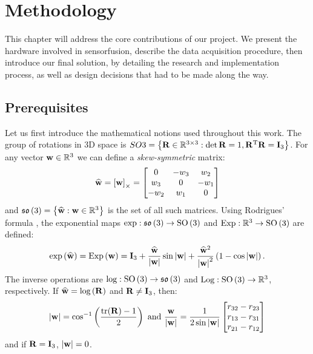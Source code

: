 \chapter{Methodology}
\label{ch:methodology}

This chapter will address the core contributions of our project.
We present the hardware involved in \gls{sensorfusion}, describe the data acquisition procedure, then introduce our final solution, by detailing the research and implementation process, as well as design decisions that had to be made along the way.

\section{Prerequisites}

\newcommand{\wvec}{\vecx{w}}
\newcommand{\what}{\widehat{\vecx{w}}}
\newcommand{\wmod}{\left|\vecx{w}\right|}
\newcommand{\xihat}{\widehat{\xi}}

Let us first introduce the mathematical notions used throughout this work. The group of rotations in 3D space is $SO{3} = \left\{\mathbf{R} \in {\mathbb{R}}^{3\times3} : \det{\mathbf{R}} = 1, {\mathbf{R}}^\text{T}\mathbf{R} = \mathbf{I}_3 \right\}$. For any vector $\wvec \in \RR^3$ we can define a \emph{skew-symmetric} matrix:
\begin{equation}
	\what  = \skewsym{\wvec} =
	\begin{bmatrix}
		0    & -w_3 & w_2  \\
		w_3  & 0    & -w_1 \\
		-w_2 & w_1  & 0
	\end{bmatrix}
\end{equation}
and $\so{3} = \left\{\what : \vecx{w} \in \RR^3 \right\}$ is the set of all such matrices. Using Rodrigues' formula \cite{murray2017mathematical}, the exponential maps $\text{exp}: \mathfrak{so}\left(3\right) \rightarrow \operatorname{SO}\left(3\right)$ and $\text{Exp} :{\mathbb{R}}^3 \rightarrow \operatorname{SO}\left(3\right)$ are defined:
\begin{equation}
	\expmap{\what} =\Expmap{\wvec}= \matx{I}_3 + \frac{\what}{\wmod} \sin{\wmod} + \frac{\what^2}{\wmod^2}\left(1 - \cos{\wmod}\right)\text{.}
\end{equation}
The inverse operations are $\text{log}:  \operatorname{SO}\left(3\right) \rightarrow \mathfrak{so}\left(3\right)$ and $\text{Log} :\operatorname{SO}\left(3\right) \rightarrow {\mathbb{R}}^3$, respectively. If $\what = \logmap{\matx{R}}$ and $\mathbf{R} \neq \mathbf{I}_3$, then:
\begin{equation}
	\wmod = \cos^{-1}\left(\frac{\text{tr}(\matx{R}) - 1}{2}\right)
	\text{ and }
	\frac{\wvec}{\wmod} = \frac{1}{2\sin{\wmod}}\begin{bmatrix}
		r_{32} - r_{23} \\ r_{13} - r_{31} \\ r_{21}-r_{12}
	\end{bmatrix}
\end{equation}
and if $\mathbf{R} = \mathbf{I}_3$, $\wmod=0$.

